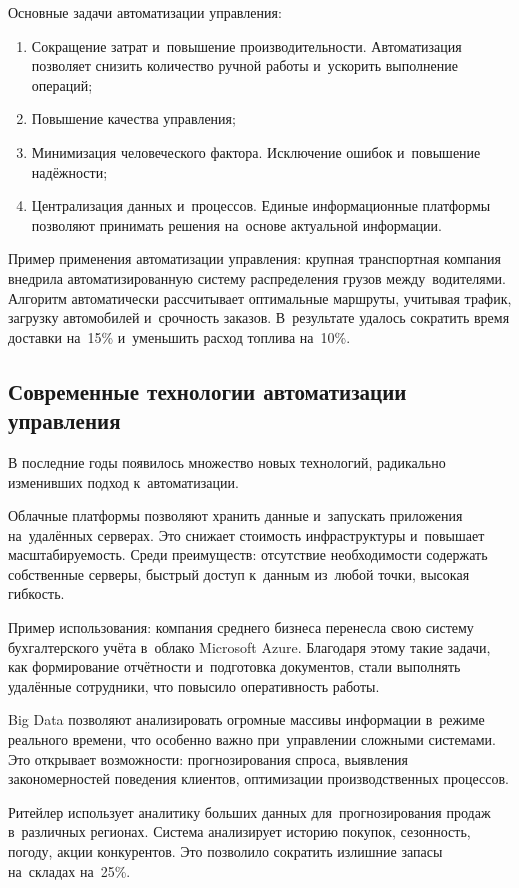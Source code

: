 \documentclass{ou}
\begin{document}
Основные задачи автоматизации управления:
\begin{enumerate}[leftmargin=0em, itemindent=3.75em, nosep, label=\arabic*)]
\item Сокращение затрат и~повышение производительности. Автоматизация позволяет снизить количество ручной работы и~ускорить выполнение операций;
\item Повышение качества управления;
\item Минимизация человеческого фактора. Исключение ошибок и~повышение надёжности;
\item Централизация данных и~процессов. Единые информационные платформы позволяют принимать решения на~основе актуальной информации.
\end{enumerate}

Пример применения автоматизации управления: крупная транспортная компания внедрила автоматизированную систему распределения грузов между~водителями. Алгоритм автоматически рассчитывает оптимальные маршруты, учитывая трафик, загрузку автомобилей и~срочность заказов. В~результате удалось сократить время доставки на~15\% и~уменьшить расход топлива на~10\%.
\subsection{Современные технологии автоматизации управления}
В последние годы появилось множество новых технологий, радикально изменивших подход к~автоматизации.

Облачные платформы позволяют хранить данные и~запускать приложения на~удалённых серверах. Это снижает стоимость инфраструктуры и~повышает масштабируемость. Среди преимуществ: отсутствие необходимости содержать собственные серверы, быстрый доступ к~данным из~любой точки, высокая гибкость.

Пример использования: компания среднего бизнеса перенесла свою систему бухгалтерского учёта в~облако Microsoft Azure. Благодаря этому такие задачи, как формирование отчётности и~подготовка документов, стали выполнять удалённые сотрудники, что повысило оперативность работы.

Big Data позволяют анализировать огромные массивы информации в~режиме реального времени, что особенно важно при~управлении сложными системами. Это открывает возможности: прогнозирования спроса, выявления закономерностей поведения клиентов, оптимизации производственных процессов.

Ритейлер использует аналитику больших данных для~прогнозирования продаж в~различных регионах. Система анализирует историю покупок, сезонность, погоду, акции конкурентов. Это позволило сократить излишние запасы на~складах на~25\%.
\end{document}
